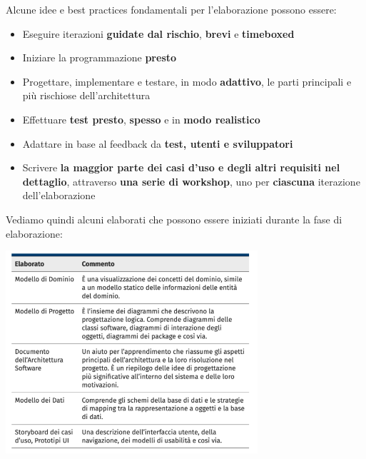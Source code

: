 \documentclass[12pt]{article}
\begin{document}
Alcune idee e best practices fondamentali per l'elaborazione possono essere:
\begin{itemize}
    \item Eseguire iterazioni \textbf{guidate dal rischio}, \textbf{brevi} e \textbf{timeboxed}
    \item Iniziare la programmazione \textbf{presto}
    \item Progettare, implementare e testare, in modo \textbf{adattivo}, le parti principali e più rischiose dell'architettura
    \item Effettuare \textbf{test presto}, \textbf{spesso} e in \textbf{modo realistico}
    \item Adattare in base al feedback da \textbf{test, utenti e sviluppatori}
    \item Scrivere \textbf{la maggior parte dei casi d'uso e degli altri requisiti nel dettaglio}, attraverso \textbf{una serie di workshop}, uno per \textbf{ciascuna} iterazione dell'elaborazione
\end{itemize}
Vediamo quindi alcuni elaborati che possono essere iniziati durante la fase di elaborazione:
\begin{center}
    \includegraphics[width = 0.70\textwidth]{Images/46.png}
\end{center}
\end{document}
